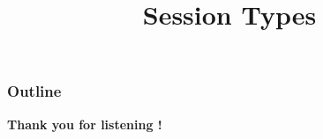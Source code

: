 \documentclass[xcolor=dvipsnames, aspectratio=169, 10pt]{beamer}
\title[]{Session Types}
\begin{document}
\date{}
\begin{frame}
	\titlepage
\end{frame}

\begin{frame}
	\frametitle{Outline}
	\tableofcontents
\end{frame}






\begin{frame}
	\begin{center}
		\Huge\textbf{Thank you for listening !}
	\end{center}
\end{frame}
\end{document}
